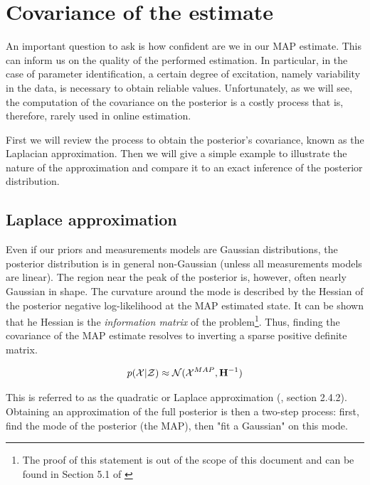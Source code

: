 \appendix




\chapter{Covariance of the estimate}
\label{chp:MAP_covariance}
An important question to ask is how confident are we in our MAP estimate.
This can inform us on the quality of the performed estimation. In particular, in the case of parameter identification, a certain degree of excitation,
namely variability in the data, is necessary to obtain reliable values. Unfortunately, as we will see, the computation of the covariance on the posterior
is a costly process that is, therefore, rarely used in online estimation.

First we will review the process to obtain the posterior's covariance, known as the Laplacian approximation. Then we will give a simple example to
illustrate the nature of the approximation and compare it to an exact inference of the posterior distribution.

\section{Laplace approximation}
\label{sec:map_covariance}
Even if our priors and measurements models are Gaussian distributions, the posterior distribution
is in general non-Gaussian (unless all measurements models are linear). The region near the peak of the posterior is, however, often nearly Gaussian in shape.
The curvature around the mode is described by the Hessian of the posterior negative log-likelihood at the MAP estimated state. 
It can be shown that he Hessian is the \textit{information matrix} of the problem\footnote{The proof of this statement is out of the scope of this document and can be found in Section 5.1 of
\cite{peng2018advanced}}. Thus, finding the covariance of the MAP estimate resolves to inverting a 
sparse positive definite matrix.

\begin{equation}
    p(\mathcal{X} | \mathcal{Z}) \approx \mathcal{N}({\mathcal{X}^{MAP}},{{\bf H}^{-1}})
    \label{eq:map_laplace}
\end{equation}

This is referred to as the quadratic or Laplace approximation (\cite{mcelreath2018statistical}, section 2.4.2). Obtaining an approximation of the full posterior is then a two-step process: 
first, find the mode of the posterior (the MAP), then "fit a Gaussian" on this mode. 

